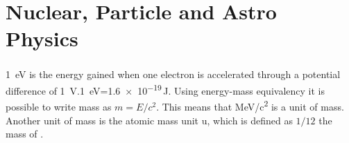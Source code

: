 %
%
%
%
%
%
%
\part{Nuclear, Particle and Astro Physics}
\section{}

\SI{1}{eV} is the energy gained when one electron is accelerated through a potential difference of \SI{1}{V}.\linebreak \SI{1}{eV}=\num{1.6e-19}\,\si{J}. Using energy-mass equivalency it is possible to write mass as \(m=E/c^2\). This means that \si{MeV/c^{2}} is a unit of mass. Another unit of mass is the atomic mass unit \si{u}, which is defined as \(1/12\) the mass of .

